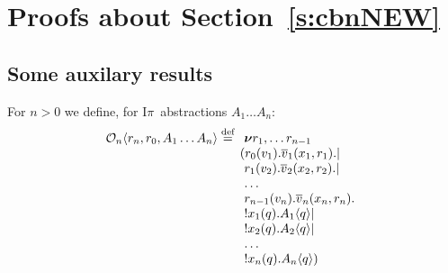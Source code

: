 \documentclass[11pt,a4paper]{amsart}
\theoremstyle{plain}
\theoremstyle{definition}
\theoremstyle{defC}
\theoremstyle{thmC}
\theoremstyle{plain}
\numberwithin{equation}{section}
\newif\iflong\longtrue
\def\finish#1{\vskip.2cm\noindent{\em #1}%
  \marginpar{$\longleftarrow$}\vskip.2cm}
\newcommand{\finish}[1]{}
\newcommand{\uptoComp}[1]{\mathrel{#1^{|\star}}}
\newcommand{\obj}[1]{\langle #1 \rangle}
\def\res#1{{\boldsymbol \nu} #1\:}   %
\def\inp#1#2{#1(#2)}
\def\inpw#1#2{#1(#2)}
\newcommand{\inpi}[3]{ \inpw{#1_{#2}}{#3} }%
\newcommand{\bopi}[3]{ \overline{#1}_{#2}({#3}) }%
\def\app#1#2{#1\obj{#2}}                    %
\newcommand{\ctx}[1]{#1^{\rmm{ctx}}  }   %
\newcommand{\rmm}[1]{{\tt{\lowercase{#1}}}}
\newcommand{\genarr}[2]{\mathrel{\stackrel{{#1}}{\longrightarrow}_{\rmm{\lowercase{#2}}}}}
\newcommand{\genLongrightarrow}[1]{\mathrel{\Longrightarrow_{\rmm{\lowercase{#1}}}}}
\newcommand{\arrPI}[1]{\genarr{#1}{\pi}}   %
\newcommand{\Longrightarrowp}{\genLongrightarrow{C}}
\newcommand{\genwb}[1]{\mathrel{\approx_{\rmm{\lowercase{#1}}}}}       %
\newcommand{\wbPI}{\genwb{\pi}}       %
\newcommand{\contr}{\mathrel{\mbox{}_{\pi}\!\!\gtrsim}}
\def\R{{\mathcal R}}
\def\defi{\stackrel{\mbox{\scriptsize {\rm{def}}}}{=}} %
\newcommand{\FF}{F}
\newcommand{\encoNa}[2]{{\mathcal {N}} \app{[\! [ #1 ] \! ]}{#2}  }
\newcommand{\encoEnvV}[1]{{\mathcal {O}} [\! [ #1 ] \! ]  } %
\newcommand{\encoConV}{\encoEnvV} %
\newcommand{\Intp}{\mbox{I$\pi$}\xspace}   %
\newcommand{\piI}{\Intp}   %
\newcommand{\qOUT}{{\mathcal O}}
\newcommand{\OUTU}[5]{\app{\qOUT_{#1}}{#2, #3, #4  }}
\newcommand{\dsJ}[1]{\finish{{\bf DS(jun23):} #1}}
\newcommand{\dsJ}[1]{}
\theoremstyle{plain}
\theoremstyle{definition}
\begin{document}






%
%
%
%
%

\section{Proofs about Section~\ref{s:cbnNEW}}
\label{a:cbn}
             
\subsection{Some auxilary results}



             

For $n>0$ we  define, for \piI\ abstractions  $A_1 \ldots A_n$:
\[\begin{array}{l}
\OUTU n {r_n}{r_0} {A_1 \ldots A_n}{} \defi 
\begin{array}[t]{l}
\res{r_1, \ldots r_{n-1}} \\
\! \! (\inpi r 0 {v_1} . \bopi v 1{x_{1},r_{1}}.    
 | \\
\inpi r 1 {v_2} . \bopi v 2{x_{2},r_{2}}    .  
 | \\
\ldots  \\
\inpi r {n-1} {v_n} . \bopi v n{x_{n},r_{n}}    .  
 \\
  !  \inp {x_1} {q} . {\app{A_1}{q} } | \\
  !  \inp {x_2} {q} . {\app{A_2}{q} } | \\
\ldots  \\
  !  \inp {x_n} {q} . {\app{A_n}{q} } )
  \end{array} 
  \end{array} 
\]
\end{document}

